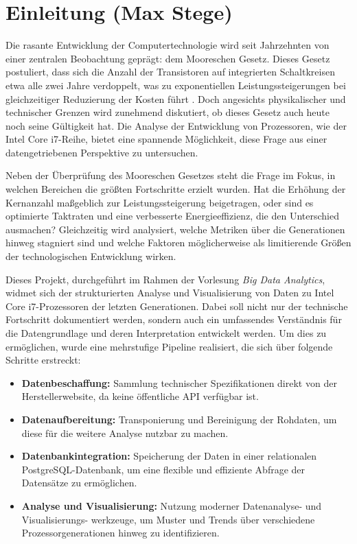 \chapter{Einleitung (Max Stege)}

\nocite{*}

Die rasante Entwicklung der Computertechnologie wird seit Jahrzehnten von einer zentralen Beobachtung geprägt: dem Mooreschen Gesetz. Dieses Gesetz postuliert, dass sich die Anzahl der Transistoren auf integrierten Schaltkreisen etwa alle zwei Jahre verdoppelt, was zu exponentiellen Leistungssteigerungen bei gleichzeitiger Reduzierung der Kosten führt \cite{noauthor_moores_nodate}. Doch angesichts physikalischer und technischer Grenzen wird zunehmend diskutiert, ob dieses Gesetz auch heute noch seine Gültigkeit hat. Die Analyse der Entwicklung von Prozessoren, wie der Intel Core i7-Reihe, bietet eine spannende Möglichkeit, diese Frage aus einer datengetriebenen Perspektive zu untersuchen.

Neben der Überprüfung des Mooreschen Gesetzes steht die Frage im Fokus, in welchen Bereichen die größten Fortschritte erzielt wurden. Hat die Erhöhung der Kernanzahl maßgeblich zur Leistungssteigerung beigetragen, oder sind es optimierte Taktraten und eine verbesserte Energieeffizienz, die den Unterschied ausmachen? Gleichzeitig wird analysiert, welche Metriken über die Generationen hinweg stagniert sind und welche Faktoren möglicherweise als limitierende Größen der technologischen Entwicklung wirken.

Dieses Projekt, durchgeführt im Rahmen der Vorlesung \textit{Big Data Analytics}, widmet sich der strukturierten Analyse und Visualisierung von Daten zu Intel Core i7-Prozessoren der letzten Generationen. Dabei soll nicht nur der technische Fortschritt dokumentiert werden, sondern auch ein umfassendes Verständnis für die Datengrundlage und deren Interpretation entwickelt werden. Um dies zu ermöglichen, wurde eine mehrstufige Pipeline realisiert, die sich über folgende Schritte erstreckt:

\begin{itemize}
    \item \textbf{Datenbeschaffung:} Sammlung technischer Spezifikationen direkt von der Herstellerwebsite, da keine öffentliche API verfügbar ist.
    \item \textbf{Datenaufbereitung:} Transponierung und Bereinigung der Rohdaten, um diese für die weitere Analyse nutzbar zu machen.
    \item \textbf{Datenbankintegration:} Speicherung der Daten in einer relationalen PostgreSQL-Datenbank, um eine flexible und effiziente Abfrage der Datensätze zu ermöglichen.
    \item \textbf{Analyse und Visualisierung:} Nutzung moderner Datenanalyse- und Visualisierungs- werkzeuge, um Muster und Trends über verschiedene Prozessorgenerationen hinweg zu identifizieren.
\end{itemize}


